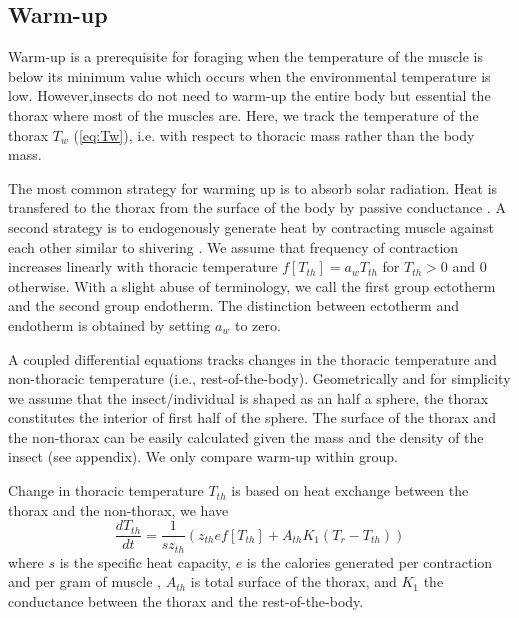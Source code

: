 
\subsection*{Warm-up}
Warm-up is a prerequisite for foraging when the temperature of the muscle is below its minimum value which occurs when the environmental temperature is low. 
However,insects do not need to warm-up the entire body but essential the thorax where most of the muscles are. 
Here, we track the temperature of the thorax $T_w$ (\cref{eq:Tw}), i.e. with respect to thoracic mass rather than the body mass.

The most common strategy for warming up is to absorb solar radiation.
Heat is transfered to the thorax from the surface of the body by passive conductance \citep{Bakken1976}.
A second strategy is to endogenously generate heat by contracting muscle against each other similar to shivering \citep[e.g.,][]{Kammer1974}.
We assume that frequency of contraction increases linearly with thoracic temperature $f[T_{th}]  = a_w T_{th}$ for $T_{th}> 0$ and 0 otherwise.
With a slight abuse of terminology, we call the first group  ectotherm and the second group endotherm. %
The distinction between ectotherm and endotherm is obtained by setting $a_w$ to zero.

A coupled differential equations  tracks changes in the thoracic temperature and non-thoracic temperature (i.e., rest-of-the-body).%
Geometrically and for simplicity we  assume that the insect/individual is shaped as an half a sphere, the thorax constitutes the interior of first half of the sphere.
The surface of the thorax and the non-thorax can be easily calculated given the mass and the density of the insect (see appendix).
We only compare warm-up within group.

Change in thoracic temperature $T_{th}$ is based on heat exchange between the thorax and the non-thorax, we have 
\begin{equation} \label{eq:dTh}
	\frac{dT_{th}}{dt} = \frac{1}{s z_{th}} (z_{th} e f[T_{th}] +  A_{th} K_1(T_r - T_{th}))
\end{equation}
where $s$ is the specific heat capacity, $e$ is the calories generated per contraction and per gram of muscle \citep{Kammer1974}, $A_{th}$ is total surface of the thorax, and $K_1$ the conductance between the thorax and the rest-of-the-body.

